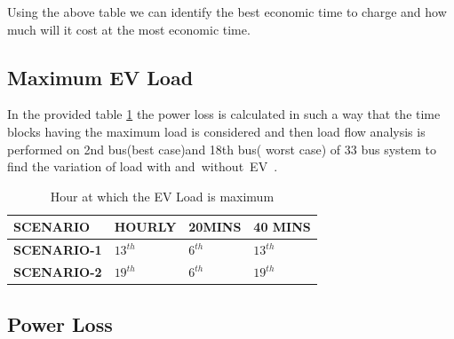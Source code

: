 		Using the above table we can identify the best economic time to charge and how much will it cost at the most economic time.

	\subsection{Maximum EV Load}
	
		In the provided table \ref{table:whichbus} the power loss is calculated in such a way that the time blocks having the maximum load  is considered and then load flow analysis is performed on 2nd bus(best case)and 18th bus( worst case) of 33 bus system to find the variation of load with and without EV .
		
			\begin{table}[!h]
			\centering
			\caption{Hour at which the EV Load is maximum }
			\begin{tabular}{|ll|ll|ll|ll|}
				\hline
				\multicolumn{2}{|l|}{\textbf{SCENARIO}} & \multicolumn{2}{l|}{\textbf{HOURLY}} & \multicolumn{2}{l|}{\textbf{20MINS}} & \multicolumn{2}{l|}{\textbf{40 MINS}} \\ \hline
				\multicolumn{2}{|l|}{\textbf{SCENARIO-1}}        & \multicolumn{2}{l|}{$ 13^{th} $}            & \multicolumn{2}{l|}{$ 6^{th} $}             & \multicolumn{2}{l|}{$ 13^{th} $}             \\ \hline
				\multicolumn{2}{|l|}{\textbf{SCENARIO-2}}        & \multicolumn{2}{l|}{$ 19^{th} $}           & \multicolumn{2}{l|}{$ 6^{th} $}             & \multicolumn{2}{l|}{$ 19^{th} $}             \\ \hline
			\end{tabular}
			\label{table:whichbus}
		\end{table}
	

	
	\subsection{Power Loss}
	
